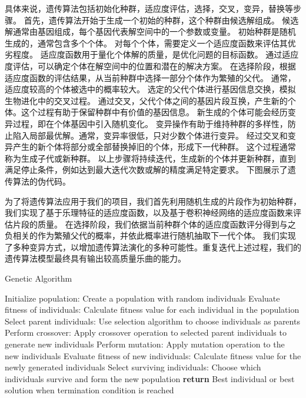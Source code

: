 \documentclass{article}
\begin{document}
具体来说，遗传算法包括初始化种群，适应度评估，选择，交叉，变异，替换等步骤。
首先，遗传算法开始于生成一个初始的种群，这个种群由候选解组成。
候选解通常由基因组成，每个基因代表解空间中的一个参数或变量。
初始种群是随机生成的，通常包含多个个体。
对每个个体，需要定义一个适应度函数来评估其优劣程度。
适应度函数用于量化个体解的质量，是优化问题的目标函数。
通过适应度评估，可以确定个体在解空间中的位置和潜在的解决方案。
在选择阶段，根据适应度函数的评估结果，从当前种群中选择一部分个体作为繁殖的父代。
通常，适应度较高的个体被选中的概率较大。
选定的父代个体进行基因信息交换，模拟生物进化中的交叉过程。
通过交叉，父代个体之间的基因片段互换，产生新的个体。这个过程有助于保留种群中有价值的基因信息。
新生成的个体可能会经历变异过程，即在个体基因中引入随机变化。
变异操作有助于维持种群的多样性，防止陷入局部最优解。通常，变异率很低，只对少数个体进行变异。
经过交叉和变异产生的新个体将部分或全部替换掉旧的个体，形成下一代种群。
这个过程通常称为生成子代或新种群。
以上步骤将持续迭代，生成新的个体并更新种群，直到满足停止条件，例如达到最大迭代次数或解的精度满足特定要求。
下图展示了遗传算法的伪代码。



为了将遗传算法应用于我们的项目，我们首先利用随机生成的片段作为初始种群，
我们实现了基于乐理特征的适应度函数，以及基于卷积神经网络的适应度函数来评估片段的质量。
在选择阶段，我们依据当前种群个体的适应度函数评分得到与之负相关的作为繁殖父代的概率，并依此概率进行随机抽取下一代个体。
我们实现了多种变异方式，以增加遗传算法演化的多种可能性。重复迭代上述过程，我们的遗传算法模型最终具有输出较高质量乐曲的能力。


\begin{algorithm}
    \caption{Genetic Algorithm}
    \begin{algorithmic}[1]
    \STATE Initialize population:
        \STATE Create a population with random individuals
    \STATE Evaluate fitness of individuals:
        \STATE Calculate fitness value for each individual in the population
    \REPEAT
        \STATE Select parent individuals:
            \STATE Use selection algorithm to choose individuals as parents
        \STATE Perform crossover:
            \STATE Apply crossover operation to selected parent individuals to generate new individuals
        \STATE Perform mutation:
            \STATE Apply mutation operation to the new individuals
        \STATE Evaluate fitness of new individuals:
            \STATE Calculate fitness value for the newly generated individuals
        \STATE Select surviving individuals:
            \STATE Choose which individuals survive and form the new population
    \STATE \textbf{return} Best individual or best solution when termination condition is reached
    \end{algorithmic}
    \end{algorithm}
\end{document}
